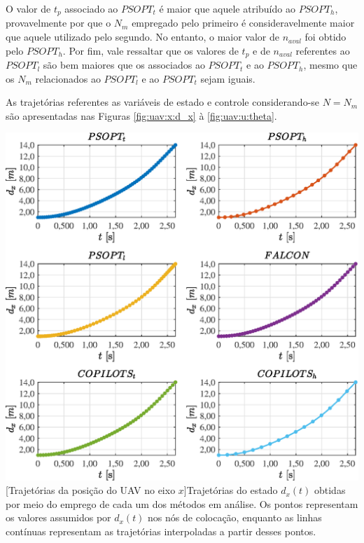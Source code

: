 O valor de $ t_p $ associado ao $ PSOPT_t $ é maior que aquele atribuído ao $ PSOPT_h $, provavelmente por que o $ N_m $ empregado pelo primeiro é consideravelmente maior que aquele utilizado pelo segundo. No entanto, o maior valor de $ n_{aval} $ foi obtido pelo $ PSOPT_h $. Por fim, vale ressaltar que os valores de $ t_p $ e de $ n_{aval} $ referentes ao $ PSOPT_l $ são bem maiores que os associados ao $ PSOPT_t $ e ao $ PSOPT_h $, mesmo que os $ N_m $ relacionados ao $ PSOPT_l $ e ao $ PSOPT_t $ sejam iguais. 


As trajetórias referentes as variáveis de estado e controle considerando-se $ N = N_m $ são apresentadas nas Figuras \ref{fig:uav:x:d_x} à \ref{fig:uav:u:theta}.

\noindent
\begin{minipage}{\textwidth}
	\vspace{\onelineskip}
	\centering
	\includegraphics[scale=0.7]{fig/resultados/uav/traj/x/d_x}
	[Trajetórias da posição do UAV no eixo $x$]{Trajetórias do estado $ d_x(t) $ obtidas por meio do emprego de cada um dos métodos em análise. Os pontos representam os valores assumidos por $ d_x(t) $ nos nós de colocação, enquanto as linhas contínuas representam as trajetórias interpoladas a partir desses pontos.}
	\label{fig:uav:x:d_x}
	\vspace{\onelineskip}
\end{minipage}

